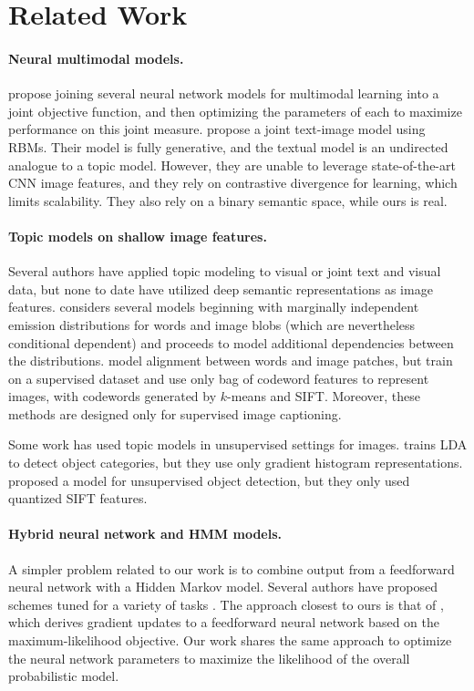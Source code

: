 \documentclass[11pt]{article}
\begin{document}
\section{Related Work}
\paragraph{Neural multimodal models.}
\cite{Lecun98} propose joining several neural network models for multimodal learning into a joint objective function, and then optimizing the parameters of each to maximize performance on this joint measure. \cite{Srivastava14} propose a joint text-image model using RBMs. Their model is fully generative, and the textual model is an undirected analogue to a topic model. However, they are unable to leverage state-of-the-art CNN image features, and they rely on contrastive divergence for learning, which limits scalability. They also rely on a binary semantic space, while ours is real.

\paragraph{Topic models on shallow image features.}
Several authors have applied topic modeling to visual or joint text and visual data, but none to date have utilized deep semantic representations as image features. \cite{Barnard03} considers several models beginning with marginally independent emission distributions for words and image blobs (which are nevertheless conditional dependent) and proceeds to model additional dependencies between the distributions. \cite{Wang09a} model alignment between words and image patches, but train on a supervised dataset and use only bag of codeword features to represent images, with codewords generated by $k$-means and SIFT. Moreover, these methods are designed only for supervised image captioning.

Some work has used topic models in unsupervised settings for images. \cite{Fritz08} trains LDA to detect object categories, but they use only gradient histogram representations. \cite{Cao07} proposed a model for unsupervised object detection, but they only used quantized SIFT features.

\paragraph{Hybrid neural network and HMM models.}
A simpler problem related to our work is to combine output from a feedforward neural network with a Hidden Markov model. Several authors have proposed schemes tuned for a variety of tasks \cite{Trentin01}. The approach closest to ours is that of \cite{Bengio92}, which derives gradient updates to a feedforward neural network based on the maximum-likelihood objective. Our work shares the same approach to optimize the neural network parameters to maximize the likelihood of the overall probabilistic model.
\end{document}
